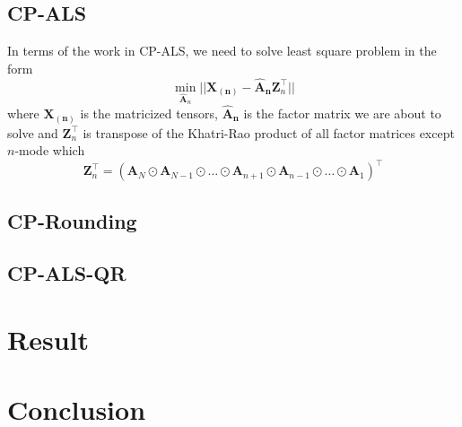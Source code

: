 \documentclass{article}
\newcommand{\mat}[1]{\mathbf{#1}}
\begin{document}
\subsection*{CP-ALS}
In terms of the work in CP-ALS, we need to solve least square problem in the form 
$$\min_{\mat{\hat{A}}_n}||\mat{X_{(n)}} - {\mat{\hat{A}_n}}\mat{Z}^\top_n ||$$
where $\mat{X_{(n)}}$ is the matricized tensors, $\mat{\hat{A}_n}$ is the factor matrix we are about to solve and 
$\mat{Z}^\top_n$ is transpose of the Khatri-Rao product of all factor matrices except $n$-mode which
$$\mat{Z}^\top_n = (\mat{A}_N \odot \mat{A}_{N-1} \odot \dots \odot \mat{A}_{n+1} \odot \mat{A}_{n-1} \odot \dots \odot \mat{A}_1)^\top $$ 


\subsection*{CP-Rounding}

\subsection*{CP-ALS-QR}




\section*{Result}


\section*{Conclusion}
\end{document}

